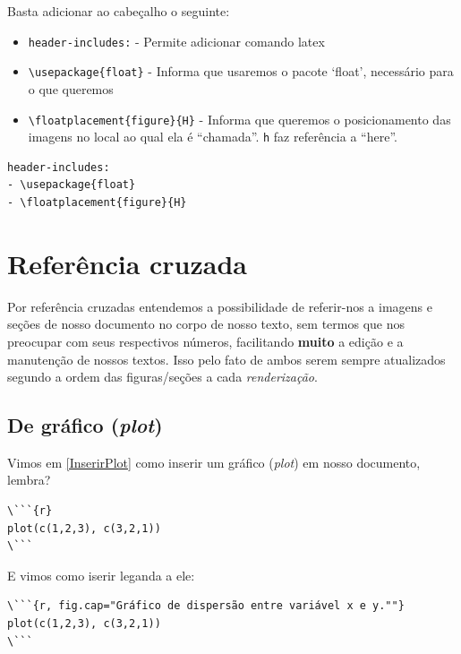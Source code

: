 \documentclass[]{book}
\providecommand{\tightlist}{%
  \setlength{\itemsep}{0pt}\setlength{\parskip}{0pt}}
\begin{document}
Basta adicionar ao cabeçalho o seguinte:

\begin{itemize}
\tightlist
\item
  \texttt{header-includes:} - Permite adicionar comando latex
\item
  \texttt{\textbackslash{}usepackage\{float\}} - Informa que usaremos o pacote `float', necessário para o que queremos
\item
  \texttt{\textbackslash{}floatplacement\{figure\}\{H\}} - Informa que queremos o posicionamento das imagens no local ao qual ela é ``chamada''. \texttt{h} faz referência a ``here''.
\end{itemize}

\begin{verbatim}
header-includes:
- \usepackage{float}
- \floatplacement{figure}{H}
\end{verbatim}

\hypertarget{crossRef}{%
\chapter{Referência cruzada}\label{crossRef}}

Por referência cruzadas entendemos a possibilidade de referir-nos a imagens e seções de nosso documento no corpo de nosso texto, sem termos que nos preocupar com seus respectivos números, facilitando \textbf{muito} a edição e a manutenção de nossos textos. Isso pelo fato de ambos serem sempre atualizados segundo a ordem das figuras/seções a cada \emph{renderização}.

\hypertarget{de-gruxe1fico-plot}{%
\section{\texorpdfstring{De gráfico (\emph{plot})}{De gráfico (plot)}}\label{de-gruxe1fico-plot}}

Vimos em \ref{InserirPlot} como inserir um gráfico (\emph{plot}) em nosso documento, lembra?

\begin{verbatim}
\```{r}
plot(c(1,2,3), c(3,2,1))
\```
\end{verbatim}

E vimos como iserir leganda a ele:

\begin{verbatim}
\```{r, fig.cap="Gráfico de dispersão entre variável x e y.""}
plot(c(1,2,3), c(3,2,1))
\```
\end{verbatim}
\end{document}
